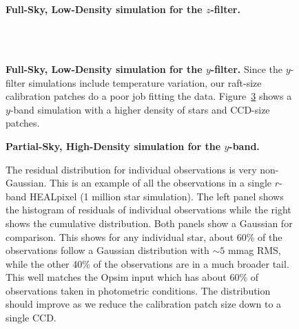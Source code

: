 \documentclass[12pt,preprint]{aastex}
\begin{document}
\begin{figure}
 \\
 \\
\caption{ {\bf Full-Sky, Low-Density simulation for the $z$-filter.}  \label{fig:z1e6}}
\end{figure}

\begin{figure}
 \\
 \\
\caption{ {\bf Full-Sky, Low-Density simulation for the $y$-filter.}  Since the $y$-filter simulations include temperature variation, our raft-size calibration patches do a poor job fitting the data.  Figure~\ref{fig:y_fd} shows a $y$-band simulation with a higher density of stars and CCD-size patches.  \label{fig:y1e6}}
\end{figure}

\begin{figure}
\caption{{\bf Partial-Sky, High-Density simulation for the $y$-band.}  \label{fig:y_fd}}
\end{figure}



\begin{figure}
\caption{The residual distribution for individual observations is very non-Gaussian.  This is an example of all the observations in a single $r$-band HEALpixel (1 million star simulation).  The left panel shows the histogram of residuals of individual observations while the right shows the cumulative distribution.  Both panels show a Gaussian for comparison.  This shows for any individual star, about 60\% of the observations follow a Gaussian distribution with $\sim5$ mmag RMS, while the other 40\% of the observations are in a much broader tail.  This well matches the Opsim input which has about 60\% of observations taken in photometric conditions.  The distribution should improve as we reduce the calibration patch size down to a single CCD.  \label{fig:resid_dist}}
\end{figure}
\end{document}

